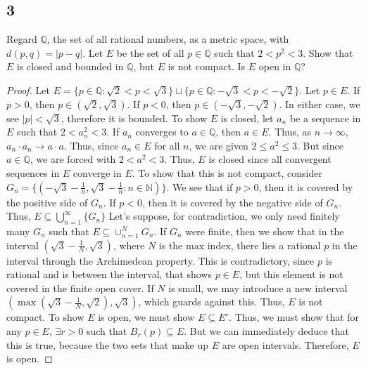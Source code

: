 \documentclass{amsart}
\begin{document}
\subsection*{3} Regard $\mathbb{Q}$, the set of all rational numbers, as a metric space, with $d(p,q) = |p-q|$. Let $E$ be the set of all $p \in \mathbb{Q}$ such that $2 < p^2 < 3$. Show that $E$ is closed and bounded in $\mathbb{Q}$, but $E$ is not compact. Is $E$ open in $\mathbb{Q}$?
\begin{proof}
    Let $E = \{p \in \mathbb{Q}: \sqrt{2} < p < \sqrt{3}\}\sqcup \{p \in \mathbb{Q}: -\sqrt{3} < p < -\sqrt{2}\}$. Let $p \in E$. If $p>0$, then $p \in (\sqrt{2},\sqrt{3})$. If $p < 0$, then $p \in (-\sqrt{3},-\sqrt{2})$. In either case, we see $|p| < \sqrt{3}$, therefore it is bounded. To show $E$ is closed, let $a_n$ be a sequence in $E$ such that $2 < a_n^2 < 3$. If $a_n$ converges to $a \in \mathbb{Q}$, then $a \in E$. Thus, as $n \rightarrow \infty$, $a_n \cdot a_n \rightarrow a \cdot a$. Thus, since $a_n \in E$ for all $n$, we are given $2 \leq a^2 \leq 3$. But since $a \in \mathbb{Q}$, we are forced with $2 < a^2 < 3$. Thus, $E$ is closed since all convergent sequences in $E$ converge in $E$. To show that this is not compact, consider $G_n = \{(-\sqrt{3}-\frac{1}{n}, \sqrt{3} - \frac{1}{n} : n \in \mathbb{N})\}$. We see that if $p>0$, then it is covered by the positive side of $G_n$. If $p<0$, then it is covered by the negative side of $G_n$. Thus, $E \subseteq \bigcup_{n=1}^\infty \{G_n\}$ Let's suppose, for contradiction, we only need finitely many $G_n$ such that $E \subseteq \cup_{n=1}^N G_n$. If $G_n$ were finite, then we show that in the interval $(\sqrt{3}-\frac{1}{N}, \sqrt{3})$, where $N$ is the max index, there lies a rational $p$ in the interval through the Archimedean property. This is contradictory, since $p$ is rational and is between the interval, that shows $p \in E$, but this element is not covered in the finite open cover. If $N$ is small, we may introduce a new interval $(\max(\sqrt{3}-\frac{1}{N}, \sqrt{2}), \sqrt{3})$, which guards against this. Thus, $E$ is not compact. To show $E$ is open, we must show $E \subseteq E^\circ$. Thus, we must show that for any $p \in E$, $\exists r > 0$ such that $B_r(p) \subseteq E$. But we can immediately deduce that this is true, because the two sets that make up $E$ are open intervals. Therefore, $E$ is open.
\end{proof}
\end{document}
